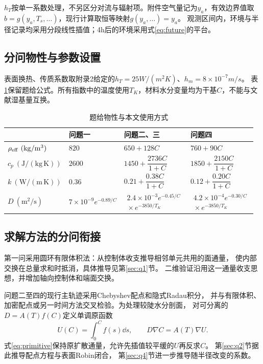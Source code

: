 $h_T$按单一系数处理，不另区分对流与辐射项。附件空气量记为$y_a$，有效边界值取$b=g(y_a,T_s,\ldots)$，现行计算取恒等映射$g(y_a,\ldots)=y_a$。
观测区间内，环境与半径记录均采用分段线性插值；4\unit{h}后的环境采用式\eqref{eq:future}的平台。

\subsection{分问物性与参数设置}
表面换热、传质系数取附录2给定的$h_T=25\unit{W/(m^2K)}$、$h_m=8\times10^{-7}\unit{m/s}$。
表\ref{tab:properties}保留题给公式。所有指数中的温度使用$T_K$，材料水分变量均为干基$C$，不能与文献湿基量互换。
\begingroup
\setlength{\intextsep}{6pt}
\begin{table}[H]
\centering\small
\caption{题给物性与本文使用方式}\label{tab:properties}
\setlength{\tabcolsep}{4pt}
\begin{tabularx}{\linewidth}{@{}lXXX@{}}
\toprule&问题一&问题二、三&问题四\\\midrule
$\rhoe\ (\mathrm{kg/m^3})$&$820$&$650+128C$&$760+90C$\\
$c_p\ (\mathrm{J/(kg\,K)})$&$2600$&$1450+\dfrac{2736C}{1+C}$&$1850+\dfrac{2150C}{1+C}$\\[5pt]
$k\ (\mathrm{W/(m\,K)})$&$0.36$&$0.21+\dfrac{0.38C}{1+C}$&$0.12+\dfrac{0.20C}{1+C}$\\[5pt]
$D\ (\mathrm{m^2/s})$&$7\times10^{-9}e^{-0.89/C}$&$\begin{gathered}2.4\times10^{-3}e^{-0.45/C}\\{}\times e^{-3850/T_K}\end{gathered}$&$\begin{gathered}4.2\times10^{-4}e^{-0.30/C}\\{}\times e^{-3850/T_K}\end{gathered}$\\
\bottomrule
\end{tabularx}
\end{table}
\endgroup

\subsection{求解方法的分问衔接}
第一问采用圆环有限体积法：从控制体收支推导相邻单元共用的面通量，
使内部交换在总量求和时抵消，具体推导见第\ref{sec:q1}节。
二维验证沿用这一通量收支思想，并增加轴向控制体和端面交换\cite{dasilva2014}。

问题二至四的现行主轨迹采用Chebyshev配点和隐式Radau积分\cite{scipy}，
并与有限体积、加密配点或另一时间方法交叉检验。为处理较陡水分剖面，
对可分离的$D=A(T)f(C)$定义单调原函数
\begin{equation}
U(C)=\int_0^C f(s)\dd s,\qquad
D\nabla C=A(T)\nabla U.
\label{eq:primitive}
\end{equation}
式\eqref{eq:primitive}保持原扩散通量，允许先插值较平缓的$U$再反求$C$。
第\ref{sec:q2}节据此推导配点方程与表面Robin闭合，
第\ref{sec:q4}节进一步推导随半径改变的系数。

